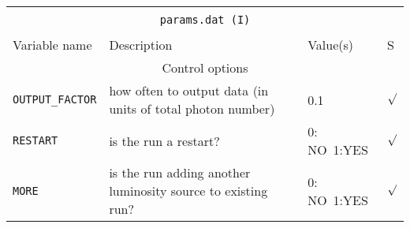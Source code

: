 \documentclass[12pt,a4paper]{article}
\begin{document}
\pagebreak 
{\centering 
\begin{tabular}{|p{3.3cm}|p{10.4cm}|p{2.5cm}|p{0.3cm}|}
\hline
\multicolumn{4}{|c|}{}\\ 
\multicolumn{4}{|c|}{\large \texttt{params.dat (I)} }\\ 
\multicolumn{4}{|c|}{}\\ 
\hline
Variable name & Description & Value(s) & S \\
\hline
\multicolumn{4}{|c|}{Control options}\\
\hline
\texttt{OUTPUT\_FACTOR} & how often to output data (in units of total photon number) & 0.1 &$\surd$\\
\texttt{RESTART} & is the run a restart? & 0: NO\ 1:YES & $\surd$\\
\texttt{MORE} & is the run adding another luminosity source to existing run? & 0: NO\ 1:YES & $\surd$\\
\hline
\end{tabular}
\par}

\vspace{1cm}
\end{document}

